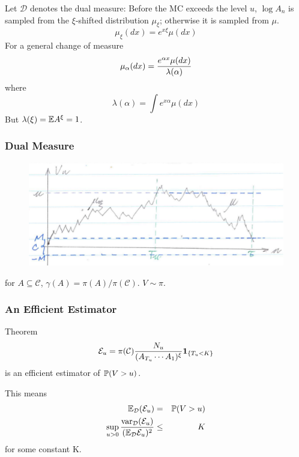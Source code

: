 \documentclass{beamer}
\begin{document}
\begin{frame}
  Let $\mathcal D$ denotes the dual measure:
  Before the MC exceeds the level $u$, $\log A_{n}$ is sampled from the
  $\xi$-shifted distribution $\mu_\xi$; otherwise it is sampled from
  $\mu$.
  \[
  \mu_\xi(dx) = e^{x \xi}\mu(dx)
  \]
  For a general change of measure
  \[
  \mu_\alpha(dx) = {
    e^{\alpha x}\mu(dx)
    \over
    \lambda(\alpha)
  }
  \]
  where
  \[
  \lambda(\alpha) = \int e^{x \alpha} \mu(dx)
  \]
  But $\lambda(\xi) = \E A^\xi = 1$.
\end{frame}

\begin{frame}
  \frametitle{Dual Measure}
  \begin{figure}[htb!]
    \centering
    \includegraphics[scale=0.6]{pic1.pdf}
  \end{figure}
  for $A \subseteq \mathcal C$, $\gamma(A) = \pi(A)/\pi(\mathcal
  C)$. $V \sim \pi$.
\end{frame}

\begin{frame}
  \frametitle{An Efficient Estimator}
  \begin{block}{Theorem}
    \[
    \mathcal E_u = \pi(\mathcal C) {N_u
      \over
      (A_{T_u} \cdots A_1)^\xi
    }\1{T_u < K}
    \]
    is an efficient estimator of $\P(V > u)$.
  \end{block}
  This means
  \begin{eqnarray*}
    \E_{\mathcal D}(\mathcal E_u) &=& \P(V > u) \\
    \sup_{u > 0} {
      \var_{\mathcal D}(\mathcal E_u)
      \over
      (\E_{\mathcal D} \mathcal E_u)^2
    } &\leq& K
  \end{eqnarray*}
  for some constant K.
\end{frame}
\end{document}
